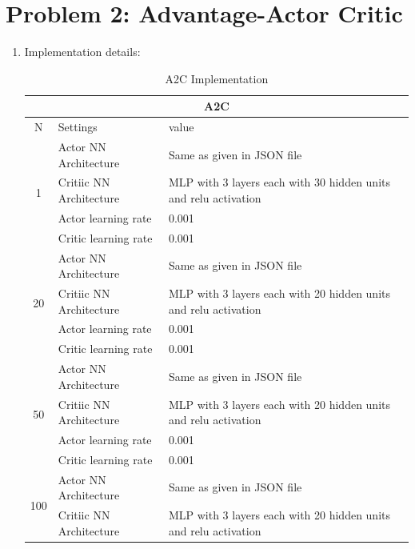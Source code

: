 \documentclass[12pt]{article}
\begin{document}
	\section*{Problem 2: Advantage-Actor Critic}
	\begin{enumerate}
		\item Implementation details:
		\begin{table}[H]
			\centering
			\caption{A2C Implementation}
			\begin{tabular}{|c|p{11.085em}|l|}
				\hline
				\multicolumn{3}{|c|}{A2C } \\
				\hline
				N     & Settings & \multicolumn{1}{p{16em}|}{value} \\
				\hline
				\multirow{4}[8]{*}{1} & Actor NN Architecture  & \multicolumn{1}{p{16em}|}{Same as given in JSON file} \\
				\cline{2-3}          & Critiic NN Architecture  & \multicolumn{1}{p{16em}|}{MLP with 3 layers each with 30 hidden units and relu activation} \\
				\cline{2-3}          & Actor learning rate & 0.001 \\
				\cline{2-3}          & Critic learning rate & 0.001 \\
				\hline
				\multirow{4}[8]{*}{20} & Actor NN Architecture  & \multicolumn{1}{p{16em}|}{Same as given in JSON file} \\
				\cline{2-3}          & Critiic NN Architecture  & \multicolumn{1}{p{16em}|}{MLP with 3 layers each with 20 hidden units and relu activation} \\
				\cline{2-3}          & Actor learning rate & 0.001 \\
				\cline{2-3}          & Critic learning rate & 0.001 \\
				\hline
				\multirow{4}[8]{*}{50} & Actor NN Architecture  & \multicolumn{1}{p{16em}|}{Same as given in JSON file} \\
				\cline{2-3}          & Critiic NN Architecture  & \multicolumn{1}{p{16em}|}{MLP with 3 layers each with 20 hidden units and relu activation} \\
				\cline{2-3}          & Actor learning rate & 0.001 \\
				\cline{2-3}          & Critic learning rate & 0.001 \\
				\hline
				\multirow{4}[7]{*}{100} & Actor NN Architecture  & \multicolumn{1}{p{16em}|}{Same as given in JSON file} \\
				\cline{2-3}          & Critiic NN Architecture  & \multicolumn{1}{p{16em}|}{MLP with 3 layers each with 20 hidden units and relu activation} \\

\end{tabular}
\end{table}
\end{enumerate}
\end{document}

